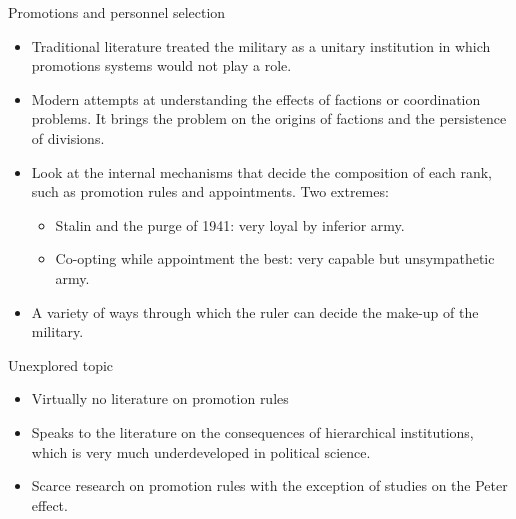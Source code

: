 \documentclass[9pt]{beamer}
\begin{document}
\begin{frame}{Promotions and personnel selection}
  \begin{itemize}
  \item Traditional literature treated the military as a unitary institution in
    which promotions systems would not play a role.
  \item Modern attempts at understanding the effects of factions or coordination
    problems. It brings the problem on the origins of factions and the
    persistence of divisions.
  \item Look at the internal mechanisms that decide the composition of each
    rank, such as promotion rules and appointments. Two extremes:
    \begin{itemize}
    \item Stalin and the purge of 1941: very loyal by inferior army.
    \item Co-opting while appointment the best: very capable but unsympathetic army.
    \end{itemize}
  \item A variety of ways through which the ruler can decide the make-up of the
    military.
  \end{itemize}
\end{frame}

\begin{frame}{Unexplored topic}
  \begin{itemize}
  \item Virtually no literature on promotion rules
  \item Speaks to the literature on the consequences of hierarchical
    institutions, which is very much underdeveloped in political science. 
  \item Scarce research on promotion rules with the exception of studies on the
    Peter effect.
  \end{itemize}
\end{frame}
\end{document}
